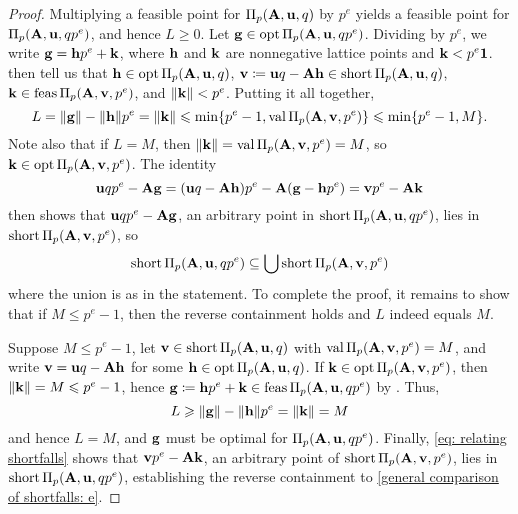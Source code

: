 \documentclass{amsart}
\begin{document}
\begin{proof}
   Multiplying a feasible point for $\Pi_p(\mathbf{A}, \mathbf{u}, q)$ by $p^e$ yields a feasible point for $\Pi_p(\mathbf{A}, \mathbf{u}, qp^e)$, and hence $L\geq 0$.
   Let $\mathbf{g} \in \operatorname{opt} \Pi_p(\mathbf{A}, \mathbf{u}, qp^e)$.
   Dividing by $p^e$, we write $\mathbf{g} = \mathbf{h} p^e + \mathbf{k}$,
   where $\mathbf{h}$ and $\mathbf{k}$ are nonnegative lattice points and $\mathbf{k} < p^e \mathbf{1}$.
    then tell us that $\mathbf{h} \in \operatorname{opt} \Pi_p(\mathbf{A},\mathbf{u},q)$, $\mathbf{v} \coloneqq \mathbf{u}q - \mathbf{A} \mathbf{h} \in \operatorname{short} \Pi_p(\mathbf{A},\mathbf{u},q)$, $\mathbf{k} \in \operatorname{feas} \Pi_p(\mathbf{A},\mathbf{v},p^e)$, and $\| \mathbf{k} \| < p^e$.
   Putting it all together, 
   \[ L = \| \mathbf{g} \|-\| \mathbf{h} \|p^e = \| \mathbf{k} \| \leqslant \min \{ p^e-1, \operatorname{val} \Pi_p(\mathbf{A}, \mathbf{v}, p^e) \} \leqslant \min \{ p^e-1, M \}.\]
   Note also that if $L=M$, then $\| \mathbf{k} \| = \operatorname{val} \Pi_p(\mathbf{A},\mathbf{v},p^e) = M$, so $\mathbf{k} \in \operatorname{opt}\Pi_p(\mathbf{A},\mathbf{v},p^e)$.
   The identity
   \begin{equation}
      \label{eq: relating shortfalls}
      \mathbf{u}qp^e-\mathbf{A} \mathbf{g} =
      (\mathbf{u}q-\mathbf{A}\mathbf{h})p^e-\mathbf{A}(\mathbf{g}-\mathbf{h}p^e) = 
      \mathbf{v}p^e-\mathbf{A}\mathbf{k}
   \end{equation}
   then shows that $\mathbf{u}qp^e-\mathbf{A} \mathbf{g}$, an arbitrary point in $\operatorname{short}\Pi_p(\mathbf{A}, \mathbf{u},q p^e)$, lies in $\operatorname{short} \Pi_p(\mathbf{A}, \mathbf{v},p^e)$, so
   \begin{equation}
      \label{general comparison of shortfalls: e}
      \operatorname{short} \Pi_p(\mathbf{A}, \mathbf{u}, qp^e) \subseteq \bigcup \operatorname{short} \Pi_p(\mathbf{A}, \mathbf{v}, p^e)
   \end{equation}
   where the union is as in the statement.
   To complete the proof, it remains to show that if $M\le p^e-1$, then the reverse containment holds and $L$ indeed equals  $M$.
   
   Suppose $M \le p^e-1$, let $\mathbf{v} \in \operatorname{short} \Pi_p(\mathbf{A}, \mathbf{u}, q)$ with $\operatorname{val}\Pi_p(\mathbf{A},\mathbf{v},p^e)=M$, and write $\mathbf{v} = \mathbf{u}q - \mathbf{A} \mathbf{h}$ for some $\mathbf{h} \in \operatorname{opt} \Pi_p(\mathbf{A}, \mathbf{u}, q)$.
   If $\mathbf{k} \in \operatorname{opt} \Pi_p(\mathbf{A}, \mathbf{v}, p^e)$, then $\| \mathbf{k} \| = M \leqslant p^e-1$, hence  $\mathbf{g} \coloneqq \mathbf{h} p^e + \mathbf{k} \in \operatorname{feas} \Pi_p(\mathbf{A},\mathbf{u},qp^e)$ by .
   Thus,
   \[ L \geqslant \| \mathbf{g} \| - \| \mathbf{h} \|p^e = \| \mathbf{k} \| = M \]
   and hence $L=M$, and $\mathbf{g}$ must be optimal for $\Pi_p(\mathbf{A},\mathbf{u},qp^e)$.
   Finally, \eqref{eq: relating shortfalls} shows that $\mathbf{v}p^e - \mathbf{A}\mathbf{k}$, an arbitrary point of $\operatorname{short} \Pi_p(\mathbf{A},\mathbf{v},p^e)$, lies in $\operatorname{short}\Pi_p(\mathbf{A},\mathbf{u},qp^e)$, establishing the reverse containment to \eqref{general comparison of shortfalls: e}.
\end{proof}
\end{document}

